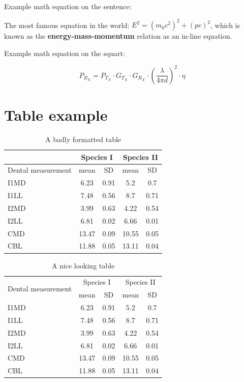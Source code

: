 Example math equation on the sentence:

The most famous equation in the world: $E^2 = (m_0c^2)^2 + (pc)^2$, which is 
known as the \textbf{energy-mass-momentum} relation as an in-line equation.


Example math equation on the squart:

\begin{equation}
P_{R_X} = P_{T_X} \cdot G_{T_X}  \cdot G_{R_X} \cdot \left( \frac{\lambda}{4\pi d} \right)^2  \cdot \eta
\end{equation}

\section{Table example}

\begin{table}[H]
\caption{A badly formatted table}
\centering
\label{table:bad_table}
\begin{tabular}{|l|c|c|c|c|}
\hline 
& \multicolumn{2}{c}{Species I} & \multicolumn{2}{c|}{Species II} \\ 
\hline
Dental measurement  & mean & SD  & mean & SD  \\ \hline 
\hline
I1MD & 6.23 & 0.91 & 5.2  & 0.7  \\
\hline 
I1LL & 7.48 & 0.56 & 8.7  & 0.71 \\
\hline 
I2MD & 3.99 & 0.63 & 4.22 & 0.54 \\
\hline 
I2LL & 6.81 & 0.02 & 6.66 & 0.01 \\
\hline 
CMD & 13.47 & 0.09 & 10.55 & 0.05 \\
\hline 
CBL & 11.88 & 0.05 & 13.11 & 0.04\\ 
\hline 
\end{tabular}
\end{table}



\begin{table}[H]
\caption{A nice looking table}
\centering
\label{table:nice_table}
\begin{tabular}{l c c c c}
\hline 
\multirow{2}{*}{Dental measurement} & \multicolumn{2}{c}{Species I} & \multicolumn{2}{c}{Species II} \\ 
\cline{2-5}
  & mean & SD  & mean & SD  \\ 
\hline
I1MD & 6.23 & 0.91 & 5.2  & 0.7  \\

I1LL & 7.48 & 0.56 & 8.7  & 0.71 \\

I2MD & 3.99 & 0.63 & 4.22 & 0.54 \\

I2LL & 6.81 & 0.02 & 6.66 & 0.01 \\

CMD & 13.47 & 0.09 & 10.55 & 0.05 \\

CBL & 11.88 & 0.05 & 13.11 & 0.04\\ 
\hline 
\end{tabular}
\end{table}



